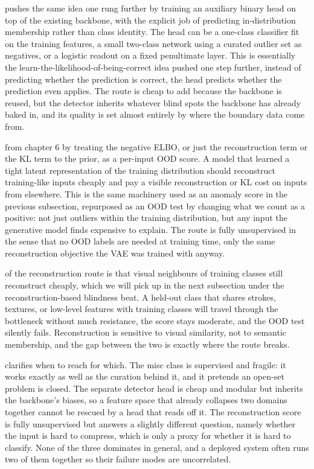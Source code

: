  pushes the same idea one rung further by training an auxiliary binary head on top of the existing backbone\cite{Chandola2009}, with the explicit job of predicting in-distribution membership rather than class identity.
The head can be a one-class classifier fit on the training features, a small two-class network using a curated outlier set as negatives, or a logistic readout on a fixed penultimate layer.
This is essentially the learn-the-likelihood-of-being-correct idea pushed one step further, instead of predicting whether the prediction is correct, the head predicts whether the prediction even applies.
The route is cheap to add because the backbone is reused, but the detector inherits whatever blind spots the backbone has already baked in, and its quality is set almost entirely by where the boundary data come from.

 from chapter 6 by treating the negative ELBO, or just the reconstruction term or the KL term to the prior, as a per-input OOD score\cite{KingmaWelling2014}.
A model that learned a tight latent representation of the training distribution should reconstruct training-like inputs cheaply and pay a visible reconstruction or KL cost on inputs from elsewhere.
This is the same machinery used as an anomaly score in the previous subsection, repurposed as an OOD test by changing what we count as a positive: not just outliers within the training distribution, but any input the generative model finds expensive to explain.
The route is fully unsupervised in the sense that no OOD labels are needed at training time, only the same reconstruction objective the VAE was trained with anyway.

 of the reconstruction route is that visual neighbours of training classes still reconstruct cheaply, which we will pick up in the next subsection under the reconstruction-based blindness beat.
A held-out class that shares strokes, textures, or low-level features with training classes will travel through the bottleneck without much resistance, the score stays moderate, and the OOD test silently fails.
Reconstruction is sensitive to visual similarity, not to semantic membership, and the gap between the two is exactly where the route breaks.

 clarifies when to reach for which.
The misc class is supervised and fragile: it works exactly as well as the curation behind it, and it pretends an open-set problem is closed.
The separate detector head is cheap and modular but inherits the backbone's biases, so a feature space that already collapses two domains together cannot be rescued by a head that reads off it.
The reconstruction score is fully unsupervised but answers a slightly different question, namely whether the input is hard to compress, which is only a proxy for whether it is hard to classify.
None of the three dominates in general, and a deployed system often runs two of them together so their failure modes are uncorrelated.

